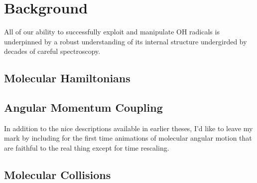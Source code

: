 \chapter{Background}
\label{bbb}

All of our ability to successfully exploit and manipulate OH radicals is underpinned by a robust understanding of its internal structure undergirded by decades of careful spectroscopy.

\section{Molecular Hamiltonians}

\section{Angular Momentum Coupling}

In addition to the nice descriptions available in earlier theses, I'd like to leave my mark by including for the first time animations of molecular angular motion that are faithful to the real thing except for time rescaling.

\section{Molecular Collisions}
